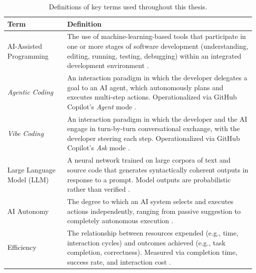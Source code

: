 \begin{table}[htbp]
  \centering
  \footnotesize
  \caption[Definitions of key terms]{Definitions of key terms used throughout this thesis.}
  \label{tab:key-definitions}

  {\renewcommand{\arraystretch}{0.85}
    \setlength{\tabcolsep}{3pt}
    \begin{tabularx}{1\textwidth}{p{2.3cm} X}
      \toprule
      \rowcolor{accentblue}
      \textbf{Term} & \textbf{Definition} \\
      \midrule

      AI-Assisted Programming & The use of machine-learning-based tools that participate in one or more stages of software development (understanding, editing, running, testing, debugging) within an integrated development environment \parencite{ziegler2024measuring}. \\

      \textit{Agentic Coding} & An interaction paradigm in which the developer delegates a goal to an AI agent, which autonomously plans and executes multi-step actions. Operationalized via GitHub Copilot's \emph{Agent} mode \parencite{sapkota2025vibecoding, sarkar2025codewithme}. \\

      \textit{Vibe Coding} & An interaction paradigm in which the developer and the AI engage in turn-by-turn conversational exchange, with the developer steering each step. Operationalized via GitHub Copilot's \emph{Ask} mode \parencite{sapkota2025vibecoding}. \\

      Large Language Model (LLM) & A neural network trained on large corpora of text and source code that generates syntactically coherent outputs in response to a prompt. Model outputs are probabilistic rather than verified \parencite{chen2021codex}. \\

      AI Autonomy & The degree to which an AI system selects and executes actions independently, ranging from passive suggestion to completely autonomous execution \parencite[pp.~287--289]{parasuraman2000model}. \\

      Efficiency & The relationship between resources expended (e.g., time, interaction cycles) and outcomes achieved (e.g., task completion, correctness). Measured via completion time, success rate, and interaction cost \parencite{ziegler2024measuring, peng2023copilot}. \\


\end{tabularx}}
\end{table}
